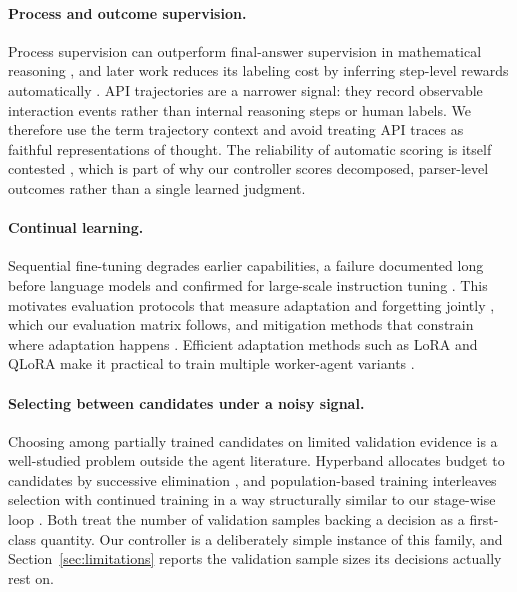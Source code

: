 \documentclass{article}
\begin{document}
\paragraph{Process and outcome supervision.}
Process supervision can outperform final-answer supervision in mathematical reasoning \citep{lightman2023verify,uesato2022process}, and later work reduces its labeling cost by inferring step-level rewards automatically \citep{wang2023shepherd}. API trajectories are a narrower signal: they record observable interaction events rather than internal reasoning steps or human labels. We therefore use the term trajectory context and avoid treating API traces as faithful representations of thought. The reliability of automatic scoring is itself contested \citep{zheng2023judging}, which is part of why our controller scores decomposed, parser-level outcomes rather than a single learned judgment.

\paragraph{Continual learning.}
Sequential fine-tuning degrades earlier capabilities, a failure documented long before language models \citep{kirkpatrick2017overcoming,lopezpaz2017gem} and confirmed for large-scale instruction tuning \citep{luo2023empirical}. This motivates evaluation protocols that measure adaptation and forgetting jointly \citep{wang2023trace}, which our evaluation matrix follows, and mitigation methods that constrain where adaptation happens \citep{wang2023olora}. Efficient adaptation methods such as LoRA and QLoRA make it practical to train multiple worker-agent variants \citep{hu2021lora,dettmers2023qlora}.

\paragraph{Selecting between candidates under a noisy signal.}
Choosing among partially trained candidates on limited validation evidence is a well-studied problem outside the agent literature. Hyperband allocates budget to candidates by successive elimination \citep{li2018hyperband}, and population-based training interleaves selection with continued training in a way structurally similar to our stage-wise loop \citep{jaderberg2017pbt}. Both treat the number of validation samples backing a decision as a first-class quantity. Our controller is a deliberately simple instance of this family, and Section~\ref{sec:limitations} reports the validation sample sizes its decisions actually rest on.
\end{document}
